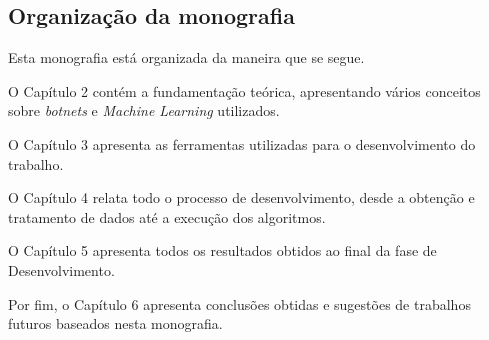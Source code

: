 \subsection{Organização da monografia}

Esta monografia está organizada da maneira que se segue.

O Capítulo 2 contém a fundamentação teórica, apresentando vários conceitos sobre \textit{botnets} e \textit{Machine Learning} utilizados.

O Capítulo 3 apresenta as ferramentas utilizadas para o desenvolvimento do trabalho.

O Capítulo 4 relata todo o processo de desenvolvimento, desde a obtenção e tratamento de dados até a execução dos algoritmos.

O Capítulo 5 apresenta todos os resultados obtidos ao final da fase de Desenvolvimento.

Por fim, o Capítulo 6 apresenta conclusões obtidas e sugestões de trabalhos futuros baseados nesta monografia.